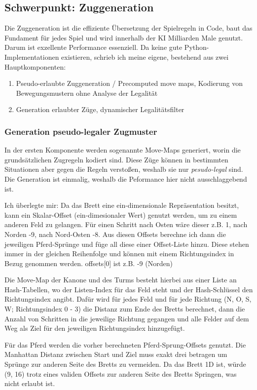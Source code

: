 \documentclass{jpp}
\begin{document}
\subsection{Schwerpunkt: Zuggeneration}
Die Zuggeneration ist die effiziente Übersetzung der Spielregeln in Code, baut das Fundament für jedes Spiel und wird innerhalb der KI Milliarden Male genutzt. Darum ist exzellente Performance essenziell. Da keine gute Python-Implementationen existieren, schrieb ich meine eigene, bestehend aus zwei Hauptkomponenten:
\begin{enumerate}
    \item Pseudo-erlaubte Zuggeneration / Precomputed move maps, Kodierung von Bewegungsmustern ohne Analyse der Legalität
    \item Generation erlaubter Züge, dynamischer Legalitätsfilter
\end{enumerate}
\subsubsection{Generation pseudo-legaler Zugmuster}
In der ersten Komponente werden sogenannte Move-Maps generiert, worin die grundsätzlichen Zugregeln kodiert sind.  Diese Züge können in bestimmten Situationen aber gegen die Regeln verstoßen, weshalb sie nur \textit{pesudo-legal} sind. Die Generation ist einmalig, weshalb die Peformance hier nicht ausschlaggebend ist.

Ich überlegte mir: Da das Brett eine ein-dimensionale Repräsentation besitzt, kann ein Skalar-Offset (ein-dimesionaler Wert)  genutzt werden, um zu einem anderen Feld zu gelangen. Für einen Schritt nach Osten wäre dieser z.B. 1, nach Norden -9, nach Nord-Osten -8. Aus diesen Offsets berechne ich dann die jeweiligen Pferd-Sprünge und füge all diese einer Offset-Liste hinzu. Diese stehen immer in der gleichen Reihenfolge und können mit einem Richtungsindex in Bezug genommen werden. offsets[0] ist z.B. -9 (Norden)

Die Move-Map der Kanone und des Turms besteht hierbei aus einer Liste an Hash-Tabellen, wo der Listen-Index für das Feld steht und der  Hash-Schlüssel den Richtungsindex angibt. Dafür wird für jedes Feld und für jede Richtung (N, O, S, W; Richtungsindex 0 - 3) die Distanz zum Ende des Bretts berechnet, dann die Anzahl von Schritten in die jeweilige Richtung gegangen und alle Felder auf dem Weg als Ziel für den jeweiligen Richtungsindex hinzugefügt.

Für das Pferd werden die vorher berechneten Pferd-Sprung-Offsets genutzt. Die Manhattan Distanz zwischen Start und Ziel muss exakt drei betragen um Sprünge zur anderen Seite des Bretts zu vermeiden. Da das Brett 1D ist, würde (9, 16) trotz eines validen Offsets zur anderen Seite des Bretts Springen, was nicht erlaubt ist.
\end{document}
